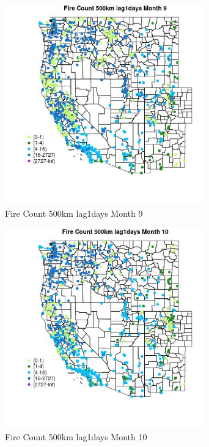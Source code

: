 \begin{figure} 
\centering  
\includegraphics[width=0.77\textwidth]{Code_Outputs/Report_ML_input_PM25_Step4_part_f_de_duplicated_aves_prioritize_24hr_obswNAs_MapObsMo9Fire_Count_500km_lag1days.jpg} 
\caption{\label{fig:Report_ML_input_PM25_Step4_part_f_de_duplicated_aves_prioritize_24hr_obswNAsMapObsMo9Fire_Count_500km_lag1days}Fire Count 500km lag1days Month 9} 
\end{figure} 
 

\begin{figure} 
\centering  
\includegraphics[width=0.77\textwidth]{Code_Outputs/Report_ML_input_PM25_Step4_part_f_de_duplicated_aves_prioritize_24hr_obswNAs_MapObsMo10Fire_Count_500km_lag1days.jpg} 
\caption{\label{fig:Report_ML_input_PM25_Step4_part_f_de_duplicated_aves_prioritize_24hr_obswNAsMapObsMo10Fire_Count_500km_lag1days}Fire Count 500km lag1days Month 10} 
\end{figure} 
 

